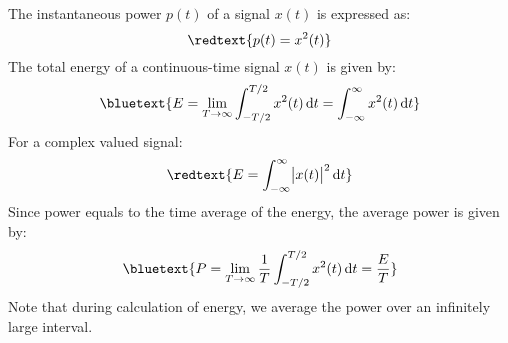 \documentclass[../notes-main.tex]{subfiles}
\begin{document}
\begin{mdframed}
    \begin{center}
    \end{center}
\end{mdframed}\label{fig:energy-signal-def-md}
\noindent {}
\begin{mdframed}
    \begin{center}
    \end{center}
\end{mdframed}\label{fig:power-signal-def-md}
\noindent The instantaneous power \(p(t)\) of a signal \(x(t)\) is expressed as:
\begin{equation}
    \redtext{p(t) = x^2(t)}
    \label{eq:instantaneous-power-def}
\end{equation}
The total energy of a continuous-time signal \(x(t)\) is given by:
\begin{equation}
    \bluetext{E = \lim_{T \to \infty} \int_{-T/2}^{T/2} x^2(t) \dif t = \int_{-\infty}^{\infty} x^2(t) \dif t}
    \label{eq:continuous-time-energy-def}
\end{equation}
For a complex valued signal:
\begin{equation}
    \redtext{E = \int_{-\infty}^{\infty} \abs{x(t)}^2 \dif t}
    \label{eq:complex-signal-energy-def}
\end{equation}
Since power equals to the time average of the energy, the average power is given by:
\begin{equation}
    \bluetext{P = \lim_{T \to \infty} \frac{1}{T} \int_{-T/2}^{T/2} x^2(t) \dif t = \frac{E}{T}}
    \label{eq:average-power-def}
\end{equation}
\noindent Note that during calculation of energy, we average the power over an infinitely large interval.

\begin{mdframed}
    \begin{center}
    \end{center}
\end{mdframed}\label{fig:energy-power-relationship-1}
\end{document}
